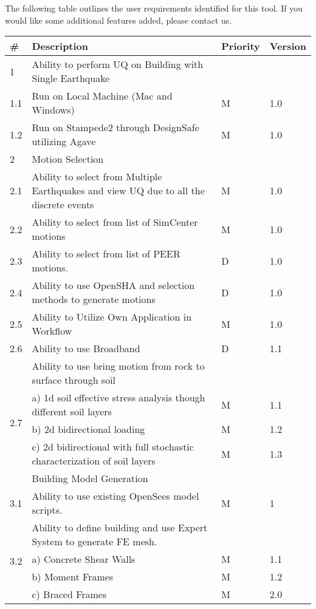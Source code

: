 The following table outlines the user requirements identified for this
tool. If you would like some additional features added, please contact us.

\begin{table}[hbt!]                 
  \centering
\begin{adjustbox}{max width=\textwidth}            
  \begin{tabular}{llll}                    
    \toprule          
      \# & Description & Priority & Version \\ \hline
    
      1 & Ability to perform UQ on Building with Single Earthquake &  &  \\ \hline
	1.1 & Run on Local Machine (Mac and Windows) & M & 1.0 \\ \hline
	1.2 & Run on Stampede2 through DesignSafe utilizing Agave & M & 1.0 \\ \hline
	2 & Motion Selection &  &  \\ \hline
	2.1 & Ability to select from Multiple Earthquakes and view UQ due to all the discrete events & M & 1.0  \\ \hline
	2.2 & Ability to select from list of SimCenter motions & M & 1.0 \\ \hline
	2.3 & Ability to select from list of PEER motions. & D & 1.0 \\ \hline
	2.4 & Ability to use OpenSHA and selection methods to generate motions & D & 1.0 \\ \hline
	2.5 & Ability to Utilize Own Application in Workflow & M & 1.0 \\ \hline
	2.6 & Ability to use Broadband & D & 1.1 \\ \hline
	\multirow{5}{*}{2.7} 
	& Ability to use bring motion from rock to surface through soil &  &  \\ 
	 & a)     1d soil effective stress analysis though different soil layers & M & 1.1  \\ 
	 & b)     2d bidirectional loading & M & 1.2 \\ 
	 & c)     2d bidirectional with full stochastic characterization of soil layers & M & 1.3 \\ \hline

	3 & Building Model Generation &  &  \\ \hline
	3.1 & Ability to use existing OpenSees model scripts. & M & 1 \\ \hline
	\multirow{5}{*}{3.2}  & Ability to define building and use Expert System to generate FE mesh. &  &  \\
	 & a)     Concrete Shear Walls & M & 1.1 \\ 
	 & b)     Moment Frames & M & 1.2 \\ 
	 & c)     Braced Frames & M & 2.0  \\ \hline
	 

\end{tabular}
\end{adjustbox}
\end{table}
